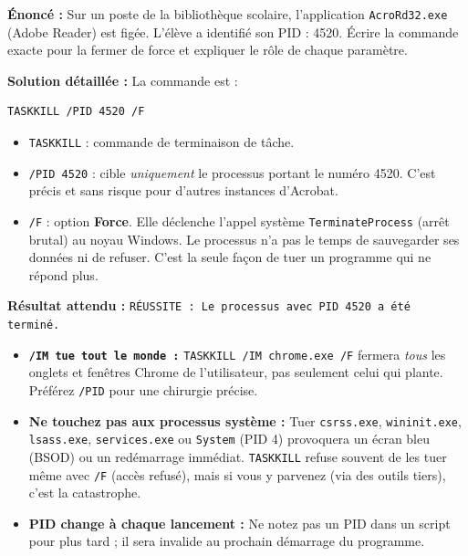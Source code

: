 \documentclass[11pt]{article}
\begin{document}
\begin{exoresolu}
\textbf{Énoncé :} Sur un poste de la bibliothèque scolaire, l'application \texttt{AcroRd32.exe} (Adobe Reader) est figée. L'élève a identifié son PID : 4520. Écrire la commande exacte pour la fermer de force et expliquer le rôle de chaque paramètre.

\textbf{Solution détaillée :}
La commande est :
\begin{lstlisting}
TASKKILL /PID 4520 /F
\end{lstlisting}
\begin{itemize}
    \item \texttt{TASKKILL} : commande de terminaison de tâche.
    \item \texttt{/PID 4520} : cible \emph{uniquement} le processus portant le numéro 4520. C'est précis et sans risque pour d'autres instances d'Acrobat.
    \item \texttt{/F} : option \textbf{Force}. Elle déclenche l'appel système \texttt{TerminateProcess} (arrêt brutal) au noyau Windows. Le processus n'a pas le temps de sauvegarder ses données ni de refuser. C'est la seule façon de tuer un programme qui ne répond plus.
\end{itemize}
\textbf{Résultat attendu :} \texttt{RÉUSSITE : Le processus avec PID 4520 a été terminé.}
\end{exoresolu}

\begin{attention}
\begin{itemize}
    \item \textbf{\texttt{/IM tue tout le monde :}} \texttt{TASKKILL /IM chrome.exe /F} fermera \emph{tous} les onglets et fenêtres Chrome de l'utilisateur, pas seulement celui qui plante. Préférez \texttt{/PID} pour une chirurgie précise.
    \item \textbf{Ne touchez pas aux processus système :} Tuer \texttt{csrss.exe}, \texttt{wininit.exe}, \texttt{lsass.exe}, \texttt{services.exe} ou \texttt{System} (PID 4) provoquera un écran bleu (BSOD) ou un redémarrage immédiat. \texttt{TASKKILL} refuse souvent de les tuer même avec \texttt{/F} (accès refusé), mais si vous y parvenez (via des outils tiers), c'est la catastrophe.
    \item \textbf{PID change à chaque lancement :} Ne notez pas un PID dans un script pour plus tard ; il sera invalide au prochain démarrage du programme.
\end{itemize}
\end{attention}
\end{document}
